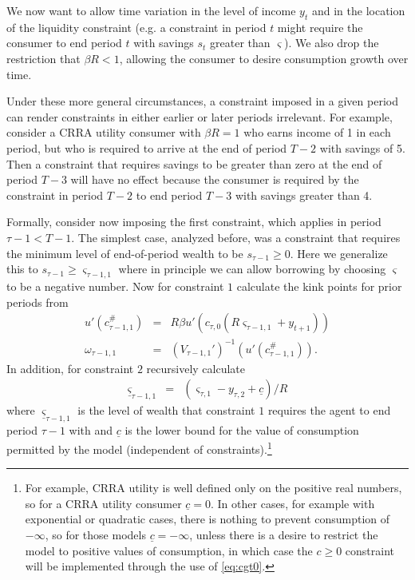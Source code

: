 \documentclass[titlepage]{\econtex}
\providecommand{\wAlt}{\omega}
\providecommand{\sConst}{\varsigma}
\begin{document}
  We now want to allow time variation in the level of income ${y}_{t}$ and in the location of the liquidity constraint (e.g$.$ a constraint in period $t$ might require the consumer to end period $t$ with savings $s_{t}$ greater than $\sConst$).  We also drop the restriction that $\beta R < 1$, allowing the consumer to desire consumption growth over time.

  Under these more general circumstances, a constraint imposed in a given period can render constraints in either earlier or later periods irrelevant.  For example, consider a CRRA utility consumer with $\beta R=1$ who earns income of 1 in each period, but who is required to arrive at the end of period $T-2$ with savings of 5.  Then a constraint that requires savings to be greater than zero at the end of period $T-3$ will have no effect because the consumer is required by the constraint in period $T-2$ to end period $T-3$ with savings greater than 4. 

  Formally, consider now imposing the first constraint, which applies in period $\tau-1 < T-1$.  The simplest case, analyzed before, was a constraint that requires the minimum level of end-of-period wealth to be $s_{\tau-1} \geq 0$.  Here we generalize this to $s_{\tau-1} \geq \sConst_{\tau-1,1}$ where in principle we can allow borrowing by choosing $\sConst$ to be a negative number. Now for constraint $1$ calculate the kink points for prior periods from
  \begin{eqnarray}
    u'(c_{\tau-1,1}^{\#}) & = & R\beta u'(c_{\tau,0}(R\sConst_{\tau-1,1}+{y}_{t+1}))
    \\ \wAlt_{\tau-1,1} & = & (V_{\tau-1,1}')^{-1}(u'(c_{\tau-1,1}^{\#})).
  \end{eqnarray}
  In addition, for constraint $2$ recursively calculate
  \begin{eqnarray}
    \underline{\sConst}_{\tau-1,1} & = & (\sConst_{\tau,1}-{y}_{\tau,2}+\underline{c})/R  \label{eq:cgt0}
  \end{eqnarray}
  where $\underline{\sConst}_{\tau-1,1}$ is the level of wealth that constraint $1$ requires the agent to end period $\tau-1$ with and $\underline{c}$ is the lower bound for the value of consumption permitted by the model (independent of constraints).\footnote{For example, CRRA utility is well defined only on the positive real numbers, so for a CRRA utility consumer $\underline{c}=0$.  In other cases, for example with exponential or quadratic cases, there is nothing to prevent consumption of $-\infty$, so for those models $\underline{c}=-\infty$, unless there is a desire to restrict the model to positive values of consumption, in which case the $c\geq 0$ constraint will be implemented through the use of \eqref{eq:cgt0}.}
\end{document}
